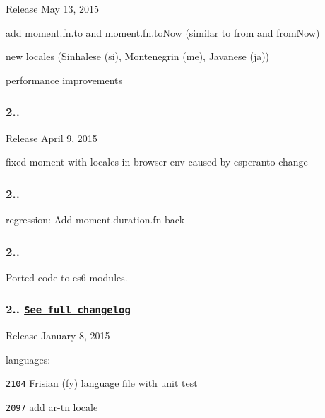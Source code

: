 \begin{DoxyItemize}
\item Release May 13, 2015
\item add {\ttfamily moment.\+fn.\+to} and {\ttfamily moment.\+fn.\+to\+Now} (similar to {\ttfamily from} and {\ttfamily from\+Now})
\item new locales (Sinhalese (si), Montenegrin (me), Javanese (ja))
\item performance improvements
\end{DoxyItemize}

\subsubsection*{2..}


\begin{DoxyItemize}
\item Release April 9, 2015
\item fixed moment-\/with-\/locales in browser env caused by esperanto change
\end{DoxyItemize}

\subsubsection*{2..}


\begin{DoxyItemize}
\item regression\+: Add moment.\+duration.\+fn back
\end{DoxyItemize}

\subsubsection*{2..}

Ported code to es6 modules.

\subsubsection*{2.. \href{https://gist.github.com/ichernev/0c9a9b49951111a27ce7}{\tt See full changelog}}


\begin{DoxyItemize}
\item Release January 8, 2015
\end{DoxyItemize}

languages\+:
\begin{DoxyItemize}
\item \href{https://github.com/moment/moment/issues/2104}{\tt 2104} Frisian (fy) language file with unit test
\item \href{https://github.com/moment/moment/issues/2097}{\tt 2097} add ar-\/tn locale
\end{DoxyItemize}

